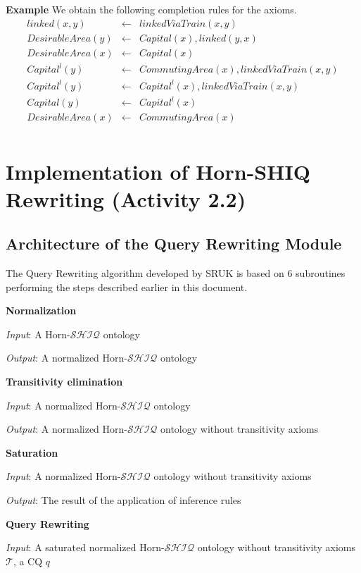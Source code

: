 \documentclass[oneside]{book}
\newcommand{\shiq}{$\mathcal{SHIQ}$\xspace}
\newcommand{\hshiq}{Horn-\shiq\xspace}
\newcommand{\T}{\mathcal{T}}
\begin{document}
\textbf{Example}
We obtain the following completion rules for the axioms.
\[
\begin{array}{lll}
linked(x,y) & \leftarrow & linkedViaTrain(x,y) \\
DesirableArea(y) & \leftarrow & Capital(x),linked(y,x) \\ 
DesirableArea(x) & \leftarrow & Capital(x)  \\
Capital^l(y) & \leftarrow & CommutingArea(x),linkedViaTrain(x,y) \\
Capital^l(y) & \leftarrow & Capital^l(x),linkedViaTrain(x,y) \\
Capital(y) & \leftarrow & Capital^l(x) \\
DesirableArea(x) & \leftarrow & CommutingArea(x) \\
\end{array}
\]

\section{Implementation of Horn-SHIQ Rewriting (Activity 2.2)}


\subsection{Architecture of the Query Rewriting Module}

The Query Rewriting algorithm developed by SRUK is based on 6 subroutines performing the steps described earlier in this document.

\noindent\textbf{Normalization}

\textit{Input}: A \hshiq ontology

\textit{Output}: A normalized \hshiq ontology 

\noindent\textbf{Transitivity elimination}

\textit{Input}: A normalized \hshiq ontology 

\textit{Output}: A normalized \hshiq ontology without transitivity axioms

\noindent\textbf{Saturation}

\textit{Input}: A normalized \hshiq ontology without transitivity axioms

\textit{Output}: The result of the application of inference rules

\noindent\textbf{Query Rewriting}

\textit{Input}: A saturated normalized \hshiq ontology without transitivity axioms $\T$, a CQ $q$
\end{document}
